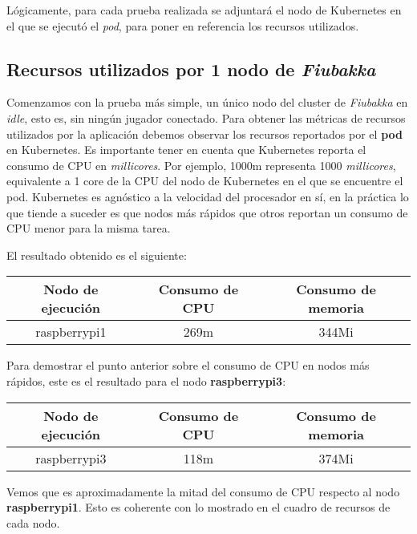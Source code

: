 Lógicamente, para cada prueba realizada se adjuntará el nodo de Kubernetes en el que se ejecutó el \textit{pod}, para poner en referencia los recursos utilizados.

\subsection{Recursos utilizados por 1 nodo de \textit{Fiubakka}}

\noindent Comenzamos con la prueba más simple, un único nodo del cluster de \textit{Fiubakka} en \textit{idle}, esto es, sin ningún jugador conectado.
Para obtener las métricas de recursos utilizados por la aplicación debemos observar los recursos reportados por el \textbf{pod} en Kubernetes.
Es importante tener en cuenta que Kubernetes reporta el consumo de CPU en \textit{millicores}. Por ejemplo, 1000m representa 1000 \textit{millicores}, equivalente
a 1 core de la CPU del nodo de Kubernetes en el que se encuentre el pod. Kubernetes es agnóstico a la velocidad del procesador en sí, en la práctica lo que tiende a suceder
es que nodos más rápidos que otros reportan un consumo de CPU menor para la misma tarea.

\noindent El resultado obtenido es el siguiente:

\begin{center}
\begin{tabular}{|c|c|c|}
    \hline
    \textbf{Nodo de ejecución} & \textbf{Consumo de CPU} & \textbf{Consumo de memoria} \\
    \hline
    raspberrypi1 & 269m & 344Mi \\
    \hline
\end{tabular}
\end{center}

\noindent Para demostrar el punto anterior sobre el consumo de CPU en nodos más rápidos, este es el resultado para el nodo \textbf{raspberrypi3}:

\begin{center}
\begin{tabular}{|c|c|c|}
    \hline
    \textbf{Nodo de ejecución} & \textbf{Consumo de CPU} & \textbf{Consumo de memoria} \\
    \hline
    raspberrypi3 & 118m & 374Mi \\
    \hline
\end{tabular}
\end{center}

\noindent Vemos que es aproximadamente la mitad del consumo de CPU respecto al nodo \textbf{raspberrypi1}. Esto es coherente con lo mostrado en el cuadro de recursos de cada
nodo.

